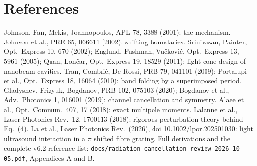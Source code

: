 \documentclass[11pt,a4paper]{article}
\begin{document}
\section{References}
\small Johnson, Fan, Mekis, Joannopoulos, APL 78, 3388 (2001): the mechanism. Johnson et al., PRE 65, 066611 (2002):
shifting boundaries. Srinivasan, Painter, Opt.\ Express 10, 670 (2002); Englund, Fushman, Vu\v ckovi\'c, Opt.\ Express 13,
5961 (2005); Quan, Lon\v car, Opt.\ Express 19, 18529 (2011): light cone design of nanobeam cavities. Tran, Combri\'e,
De Rossi, PRB 79, 041101 (2009); Portalupi et al., Opt.\ Express 18, 16064 (2010): band folding by a superimposed
period. Gladyshev, Frizyuk, Bogdanov, PRB 102, 075103 (2020); Bogdanov et al., Adv.\ Photonics 1, 016001 (2019): channel
cancellation and symmetry. Alaee et al., Opt.\ Commun.\ 407, 17 (2018): exact multipole moments. Lalanne et al., Laser
Photonics Rev.\ 12, 1700113 (2018): rigorous perturbation theory behind Eq.~(4). La et al., Laser Photonics Rev.\ (2026),
doi 10.1002/lpor.202501030: light ultrasound interaction in a $\pi$ shifted fibre grating. Full derivations and the
complete v6.2 reference list: \texttt{docs/radiation\_cancellation\_review\_2026-10-05.pdf}, Appendices A and B.
\end{document}
